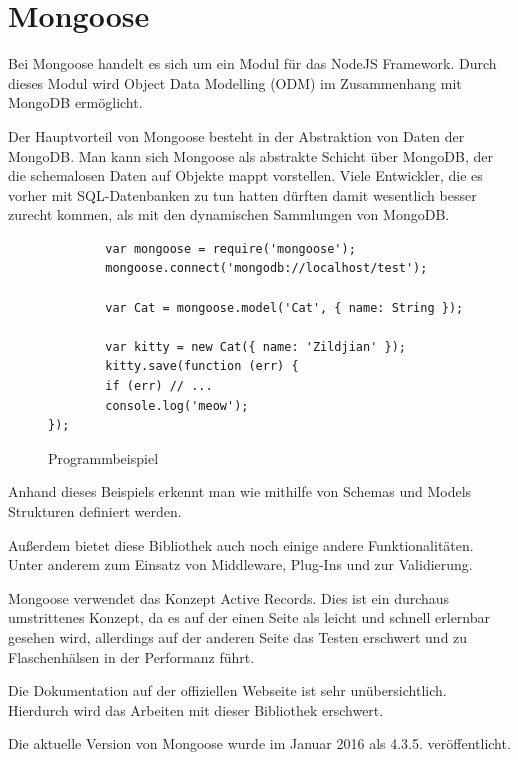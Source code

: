 \section{Mongoose}\label{mongoose}

Bei Mongoose handelt es sich um ein Modul für das NodeJS Framework.
Durch dieses Modul wird Object Data Modelling (ODM) im Zusammenhang mit MongoDB ermöglicht.

Der Hauptvorteil von Mongoose besteht in der Abstraktion von Daten der MongoDB.
Man kann sich Mongoose als abstrakte Schicht über MongoDB, der die schemalosen Daten auf Objekte mappt vorstellen.
Viele Entwickler, die es vorher mit SQL-Datenbanken zu tun hatten dürften damit wesentlich besser zurecht kommen,
als mit den dynamischen Sammlungen von MongoDB.

\begin{figure}[h]
	\centering
	\begin{lstlisting}
		var mongoose = require('mongoose');
		mongoose.connect('mongodb://localhost/test');

		var Cat = mongoose.model('Cat', { name: String });

		var kitty = new Cat({ name: 'Zildjian' });
		kitty.save(function (err) {
		if (err) // ...
		console.log('meow');
});
	\end{lstlisting}
	\caption[mongooseSchema]{Programmbeispiel \cite{mongoose:bsp}}
\end{figure}

Anhand dieses Beispiels erkennt man wie mithilfe von Schemas und Models Strukturen definiert werden.

Außerdem bietet diese Bibliothek auch noch einige andere Funktionalitäten. Unter anderem zum Einsatz von Middleware, Plug-Ins und zur Validierung.

Mongoose verwendet das Konzept Active Records. Dies ist ein durchaus umstrittenes Konzept,
da es auf der einen Seite als leicht und schnell erlernbar gesehen wird,
allerdings auf der anderen Seite das Testen erschwert und zu Flaschenhälsen in der Performanz führt. \cite{ormPattern:activeRecord}

Die Dokumentation auf der offiziellen Webseite ist sehr unübersichtlich. Hierdurch wird das Arbeiten mit dieser Bibliothek erschwert.

Die aktuelle Version von Mongoose wurde im Januar 2016 als 4.3.5. veröffentlicht.
